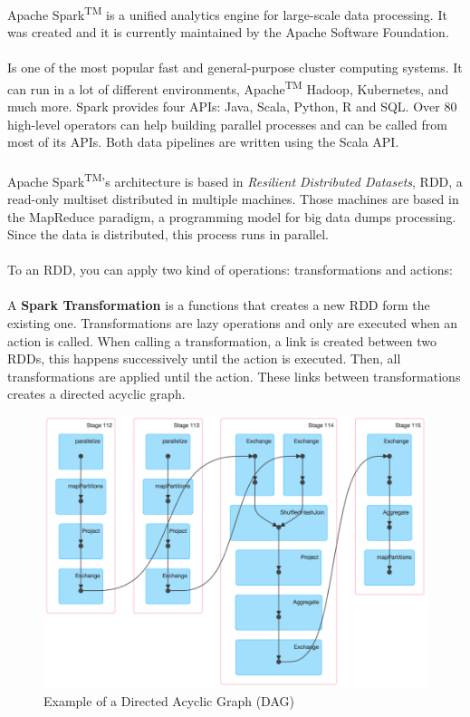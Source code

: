 Apache Spark\textsuperscript{TM} is a unified analytics engine for large-scale data processing. It was created and it is currently maintained by the Apache Software Foundation\cite{apache_software_foundation}.
\\\\
Is one of the most popular fast and general-purpose cluster computing systems. It can run in a lot of different environments, Apache\textsuperscript{TM} Hadoop\textregistered\cite{hadoop}, Kubernetes\cite{k8s},  and much more. Spark provides four APIs: Java, Scala, Python, R and SQL. Over 80 high-level operators can help building parallel processes and can be called from most of its APIs. Both data pipelines are written using the Scala API.
\\\\
Apache Spark\textsuperscript{TM}'s architecture is based in \textit{Resilient Distributed Datasets}, RDD, a read-only multiset distributed in multiple machines. Those machines are based in the MapReduce paradigm, a programming model for big data dumps processing. Since the data is distributed, this process runs in parallel.
\\\\
To an RDD, you can apply two kind of operations: transformations and actions:
\\\\
A \textbf{Spark Transformation} is a functions that creates a new RDD form the existing one. Transformations are lazy operations and only are executed when an action is called. When calling a transformation, a link is created between two RDDs, this happens successively until the action is executed. Then, all transformations are applied until the action. These links between transformations creates a directed acyclic graph.

\begin{figure}[H]
\centering
\includegraphics[scale=0.3]{resources/dag.png}
\caption{Example of a Directed Acyclic Graph (DAG)}
\end{figure}

